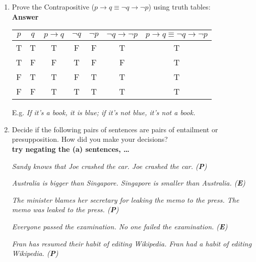 \documentclass[a4paper]{article}
\newcommand{\ix}{\ex\it}
\begin{document}
\begin{enumerate}
\item Prove the Contrapositive ($p \rightarrow q \equiv \neg q \rightarrow \neg p$) using truth tables:
  \\\textbf{Answer}
  \begin{center}
  \begin{tabular}{|c|c|c||c|c|c|c|}
    \hline
    $p$ & $q$ & $p  \rightarrow q$ &
                                     $\neg q$ & $\neg p$ & $\neg q \rightarrow \neg p $
    & $p \rightarrow q \equiv \neg q \rightarrow \neg p$ \\
    \hline
    \hline
    T & T & T& F& F& T & T\\ 
    T & F & F& T& F& F & T \\  
    F & T & T& F& T& T & T \\ 
    F & F & T& T& T& T & T \\ \hline
  \end{tabular}
\end{center}
E.g. \textit{If it's a book, it is blue; if it's not blue, it's not a book.}
  
\item  Decide if the following pairs of sentences are pairs of entailment or 
presupposition. How did you make your decisions? 
\\ \textbf{try negating the (a) sentences, \ldots}
\begin{exe}
  \ex 
  \begin{xlist}
 \ix Sandy knows that Joe crashed the car. 
 \ix Joe crashed the car. (\textbf{P})
\end{xlist}
\ex 
  \begin{xlist}
    \ix Australia is bigger than Singapore. 
    \ix Singapore is smaller than Australia.  (\textbf{E})
  \end{xlist}
\ex 
  \begin{xlist}
\ix The minister blames her secretary for leaking the memo to the press. 
\ix The memo was leaked to the press.  (\textbf{P})
\end{xlist}
\ex 
  \begin{xlist}
\ix Everyone passed the examination. 
\ix No one failed the examination.  (\textbf{E})
\end{xlist}
\ex 
\begin{xlist}
  \ix Fran has resumed their habit of editing Wikipedia. 
  \ix Fran had a habit of editing Wikipedia.  (\textbf{P})
\end{xlist}
\end{exe}


\end{enumerate}
\end{document}
